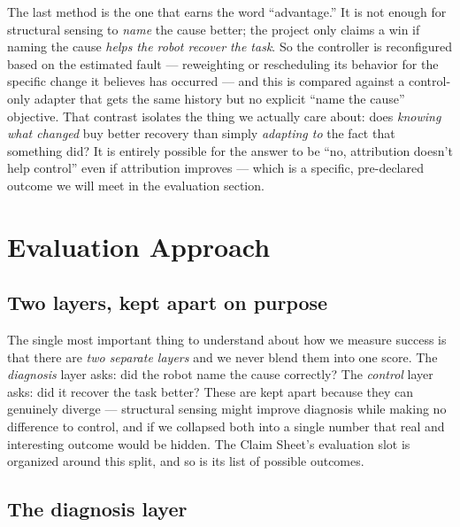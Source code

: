 \documentclass[12pt]{article}
\begin{document}
The last method is the one that earns the word ``advantage.'' It is not enough for structural sensing to \emph{name} the cause better; the project only claims a win if naming the cause \emph{helps the robot recover the task}. So the controller is reconfigured based on the estimated fault --- reweighting or rescheduling its behavior for the specific change it believes has occurred --- and this is compared against a control-only adapter that gets the same history but no explicit ``name the cause'' objective. That contrast isolates the thing we actually care about: does \emph{knowing what changed} buy better recovery than simply \emph{adapting to} the fact that something did? It is entirely possible for the answer to be ``no, attribution doesn't help control'' even if attribution improves --- which is a specific, pre-declared outcome we will meet in the evaluation section.

\section{Evaluation Approach}

\subsection{Two layers, kept apart on purpose}

The single most important thing to understand about how we measure success is that there are \emph{two separate layers} and we never blend them into one score. The \emph{diagnosis} layer asks: did the robot name the cause correctly? The \emph{control} layer asks: did it recover the task better? These are kept apart because they can genuinely diverge --- structural sensing might improve diagnosis while making no difference to control, and if we collapsed both into a single number that real and interesting outcome would be hidden. The Claim Sheet's evaluation slot is organized around this split, and so is its list of possible outcomes.

\subsection{The diagnosis layer}
\end{document}
